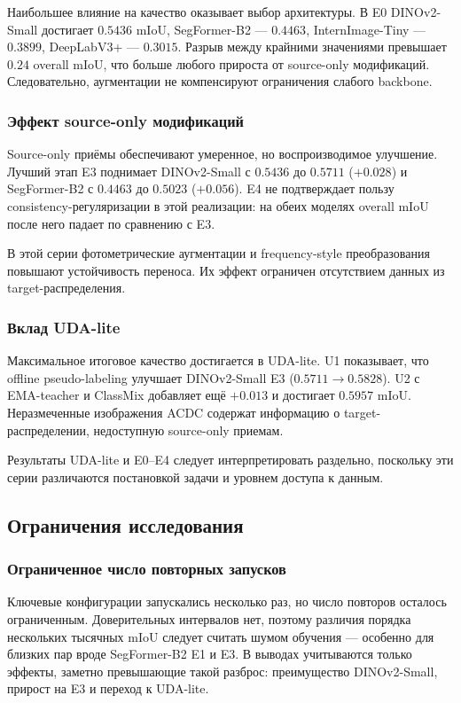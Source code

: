 \documentclass[14pt,a4paper]{extarticle}
\begin{document}
Наибольшее влияние на качество оказывает выбор архитектуры. В E0 DINOv2-Small достигает $0.5436$ mIoU, SegFormer-B2 --- $0.4463$, InternImage-Tiny --- $0.3899$, DeepLabV3+ --- $0.3015$. Разрыв между крайними значениями превышает $0.24$ overall mIoU, что больше любого прироста от source-only модификаций. Следовательно, аугментации не компенсируют ограничения слабого backbone.

\subsubsection{Эффект source-only модификаций}

Source-only приёмы обеспечивают умеренное, но воспроизводимое улучшение. Лучший этап E3 поднимает DINOv2-Small с $0.5436$ до $0.5711$ ($+0.028$) и SegFormer-B2 с $0.4463$ до $0.5023$ ($+0.056$). E4 не подтверждает пользу consistency-регуляризации в этой реализации: на обеих моделях overall mIoU после него падает по сравнению с E3.

В этой серии фотометрические аугментации и frequency-style преобразования повышают устойчивость переноса. Их эффект ограничен отсутствием данных из target-распределения.

\subsubsection{Вклад UDA-lite}

Максимальное итоговое качество достигается в UDA-lite. U1 показывает, что offline pseudo-labeling улучшает DINOv2-Small E3 ($0.5711 \to 0.5828$). U2 с EMA-teacher и ClassMix добавляет ещё $+0.013$ и достигает $0.5957$ mIoU. Неразмеченные изображения ACDC содержат информацию о target-распределении, недоступную source-only приемам.

Результаты UDA-lite и E0--E4 следует интерпретировать раздельно, поскольку эти серии различаются постановкой задачи и уровнем доступа к данным.

\subsection{Ограничения исследования}

\subsubsection{Ограниченное число повторных запусков}

Ключевые конфигурации запускались несколько раз, но число повторов осталось ограниченным. Доверительных интервалов нет, поэтому различия порядка нескольких тысячных mIoU следует считать шумом обучения --- особенно для близких пар вроде SegFormer-B2 E1 и E3. В выводах учитываются только эффекты, заметно превышающие такой разброс: преимущество DINOv2-Small, прирост на E3 и переход к UDA-lite.
\end{document}
